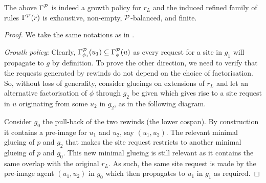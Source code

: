 \begin{theorem}
  \label{thm:energy-gp}
  The above $\Gamma^{\mathcal{P}}$ is indeed a growth policy for $r_L$
  and the induced refined family of rules $\Gamma^{\mathcal{P}}(r)$ is
  exhaustive,
  non-empty,
  $\mathcal{P}$-balanced,
  and finite.
\end{theorem}
\begin{proof}
  We take the same notations as in .

  \emph{Growth policy}:
  Clearly, $\Gamma^{\mathcal{P}}_{\phi_1}(u_1) \subseteq \Gamma^{\mathcal{P}}_\phi(u)$
  as every request for a site in $g_1$
  will propagate to $g$ by definition.
  To prove the other direction,
  we need to verify that the requests generated by rewinds
  do not depend on the choice of factorisation.
  So, without loss of generality,
  consider glueings on extensions of $r_L$
  and let an alternative factorisation of $\phi$ through $g_2$
  be given which gives rise to a site request in $u$
  originating from some $u_2$ in $g_2$,
  as in the following diagram.
  \begin{center}
  \end{center}
  Consider $g_0$ the pull-back of the two rewinds
  (\ie the lower cospan).
  By construction it contains a pre-image
  for $u_1$ and $u_2$, say $(u_1,u_2)$.
  The relevant minimal glueing of $p$ and $g_2$
  that makes the site request restricts
  to another minimal glueing of $p$ and $g_0$.
  This new minimal glueing is still relevant
  as it contains the same overlap with the original $r_L$.
  As such, the same site request is made
  by the pre-image agent $(u_1,u_2)$ in $g_0$
  which then propagates to $u_1$ in $g_1$ as required.


\end{proof}
